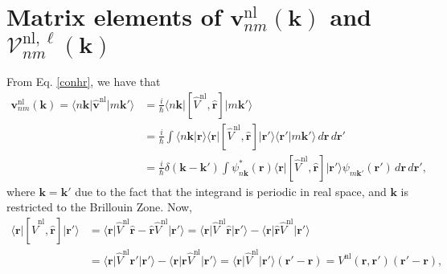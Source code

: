 
\section{Matrix elements of
\texorpdfstring{$\mathbf{v}^\mathrm{nl}_{nm}(\mathbf{k})$}{vnl} and 
\texorpdfstring{$\boldsymbol{\mathcal{V}}^{\mathrm{nl},\ell}_{nm}(\mathbf{k})$}
{calVnl}}
\label{app:vnlme}

From Eq. \eqref{conhr}, we have that
\begin{align}\label{vnln.0}
\mathbf{v}^\mathrm{nl}_{nm}(\mathbf{k})
 = \langle n\mathbf{k}\vert\hat{\mathbf{v}}^\mathrm{nl}\vert m\mathbf{k}'\rangle
&= \frac{i}{\hbar}\langle n\mathbf{k}\vert
   \left[\hat{V}^\mathrm{nl},\hat{\mathbf{r}}\right]
   \vert m\mathbf{k}'\rangle\nonumber\\
&= \frac{i}{\hbar}\int
   \langle n\mathbf{k}\vert\mathbf{r}\rangle
   \langle\mathbf{r}\vert
   \left[\hat{V}^\mathrm{nl},\hat{\mathbf{r}}\right]
   \vert\mathbf{r}'\rangle
   \langle\mathbf{r}'\vert m\mathbf{k}'\rangle
   \,d\mathbf{r}\,d\mathbf{r}'\nonumber\\
&= \frac{i}{\hbar}\delta(\mathbf{k}-\mathbf{k}')\int 
   \psi^{*}_{n\mathbf{k}}(\mathbf{r})
   \langle\mathbf{r}\vert
   \left[\hat{V}^\mathrm{nl},\hat{\mathbf{r}}\right]
   \vert\mathbf{r}'\rangle
   \psi_{m\mathbf{k}'}(\mathbf{r}')
   \,d\mathbf{r}\,d\mathbf{r}',
\end{align}   
where $\mathbf{k}=\mathbf{k}'$ due to the fact that the integrand is periodic in
real space, and $\mathbf{k}$ is restricted to the Brillouin Zone. Now,
\begin{align}\label{vnln.1}
\langle\mathbf{r}\vert
\left[\hat{V}^\mathrm{nl},\hat{\mathbf{r}}\right]
\vert\mathbf{r}'\rangle
&= \langle\mathbf{r}\vert\hat{V}^\mathrm{nl}\hat{\mathbf{r}}
   - \hat{\mathbf{r}}\hat{V}^\mathrm{nl}\vert\mathbf{r}'\rangle
 = \langle\mathbf{r}\vert
   \hat{V}^\mathrm{nl}\hat{\mathbf{r}}
   \vert\mathbf{r}'\rangle
   - \langle\mathbf{r}\vert
     \hat{\mathbf{r}}\hat{V}^\mathrm{nl}
     \vert\mathbf{r}'\rangle\nonumber\\
&= \langle\mathbf{r}\vert\hat{V}^\mathrm{nl} \mathbf{r}'\vert\mathbf{r}'\rangle
   - \langle\mathbf{r}\vert\mathbf{r}\hat{V}^\mathrm{nl}\vert\mathbf{r}'\rangle
 = \langle\mathbf{r}\vert\hat{V}^\mathrm{nl}\vert\mathbf{r}'\rangle
   (\mathbf{r}'-\mathbf{r})
 = V^\mathrm{nl}(\mathbf{r},\mathbf{r}')(\mathbf{r}'-\mathbf{r}),
\end{align}
